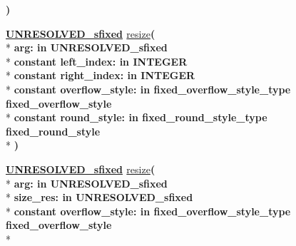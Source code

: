 \begin{DoxyCompactItemize}
{\bfseries  )} 
\item 
{\bfseries {\bfseries {\bfseries \hyperlink{classfixed__pkg_aa723b28a027c3c0f9bca02d75e8df4d6}{U\+N\+R\+E\+S\+O\+L\+V\+E\+D\+\_\+sfixed}} \textcolor{vhdlchar}{ }}} \hyperlink{classfixed__pkg_a53ad8e2e1b09715a3ab4fa151d798a67}{resize}{\bfseries  ( }\\*
{\bfseries \textcolor{vhdlchar}{arg\+: }\textcolor{stringliteral}{in }\textcolor{vhdlchar}{U\+N\+R\+E\+S\+O\+L\+V\+E\+D\+\_\+sfixed}}\\*
{\bfseries {\bfseries \textcolor{keywordflow}{constant}\textcolor{vhdlchar}{ }}\textcolor{vhdlchar}{left\+\_\+index\+: }\textcolor{stringliteral}{in }{\bfseries \textcolor{comment}{I\+N\+T\+E\+G\+E\+R}\textcolor{vhdlchar}{ }}}\\*
{\bfseries {\bfseries \textcolor{keywordflow}{constant}\textcolor{vhdlchar}{ }}\textcolor{vhdlchar}{right\+\_\+index\+: }\textcolor{stringliteral}{in }{\bfseries \textcolor{comment}{I\+N\+T\+E\+G\+E\+R}\textcolor{vhdlchar}{ }}}\\*
{\bfseries {\bfseries \textcolor{keywordflow}{constant}\textcolor{vhdlchar}{ }}\textcolor{vhdlchar}{overflow\+\_\+style\+: }\textcolor{stringliteral}{in }\textcolor{vhdlchar}{fixed\+\_\+overflow\+\_\+style\+\_\+type     fixed\+\_\+overflow\+\_\+style}}\\*
{\bfseries {\bfseries \textcolor{keywordflow}{constant}\textcolor{vhdlchar}{ }}\textcolor{vhdlchar}{round\+\_\+style\+: }\textcolor{stringliteral}{in }\textcolor{vhdlchar}{fixed\+\_\+round\+\_\+style\+\_\+type     fixed\+\_\+round\+\_\+style}}\\*
{\bfseries  )} 
\item 
{\bfseries {\bfseries {\bfseries \hyperlink{classfixed__pkg_aa723b28a027c3c0f9bca02d75e8df4d6}{U\+N\+R\+E\+S\+O\+L\+V\+E\+D\+\_\+sfixed}} \textcolor{vhdlchar}{ }}} \hyperlink{classfixed__pkg_abf8ab4f861cacff7247feeeeebedcdfb}{resize}{\bfseries  ( }\\*
{\bfseries \textcolor{vhdlchar}{arg\+: }\textcolor{stringliteral}{in }\textcolor{vhdlchar}{U\+N\+R\+E\+S\+O\+L\+V\+E\+D\+\_\+sfixed}}\\*
{\bfseries \textcolor{vhdlchar}{size\+\_\+res\+: }\textcolor{stringliteral}{in }\textcolor{vhdlchar}{U\+N\+R\+E\+S\+O\+L\+V\+E\+D\+\_\+sfixed}}\\*
{\bfseries {\bfseries \textcolor{keywordflow}{constant}\textcolor{vhdlchar}{ }}\textcolor{vhdlchar}{overflow\+\_\+style\+: }\textcolor{stringliteral}{in }\textcolor{vhdlchar}{fixed\+\_\+overflow\+\_\+style\+\_\+type     fixed\+\_\+overflow\+\_\+style}}\\*

\end{DoxyCompactItemize}
